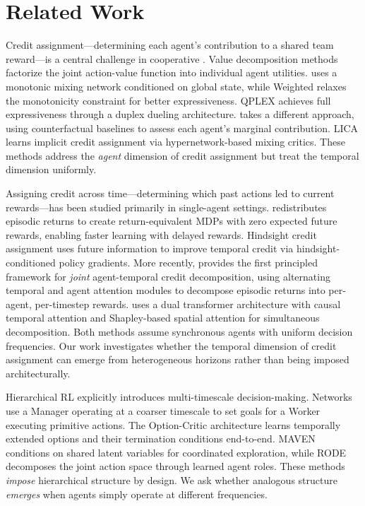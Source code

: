 \section{Related Work}
\label{sec:related}

Credit assignment---determining each agent's contribution to a shared team reward---is a central challenge in cooperative \marl. Value decomposition methods factorize the joint action-value function into individual agent utilities. \qmix \citep{rashid2018qmix} uses a monotonic mixing network conditioned on global state, while Weighted \qmix \citep{rashid2020weighted} relaxes the monotonicity constraint for better expressiveness. QPLEX \citep{wang2021qplex} achieves full expressiveness through a duplex dueling architecture. \coma \citep{foerster2018coma} takes a different approach, using counterfactual baselines to assess each agent's marginal contribution. LICA \citep{zhou2020lica} learns implicit credit assignment via hypernetwork-based mixing critics. These methods address the \emph{agent} dimension of credit assignment but treat the temporal dimension uniformly.

Assigning credit across time---determining which past actions led to current rewards---has been studied primarily in single-agent settings. \rudder \citep{arjona2019rudder} redistributes episodic returns to create return-equivalent MDPs with zero expected future rewards, enabling faster learning with delayed rewards. Hindsight credit assignment \citep{harutyunyan2019hindsight} uses future information to improve temporal credit via hindsight-conditioned policy gradients. More recently, \tartwo \citep{kapoor2024tar2} provides the first principled framework for \emph{joint} agent-temporal credit decomposition, using alternating temporal and agent attention modules to decompose episodic returns into per-agent, per-timestep rewards. \stas \citep{chen2024stas} uses a dual transformer architecture with causal temporal attention and Shapley-based spatial attention for simultaneous decomposition. Both methods assume synchronous agents with uniform decision frequencies. Our work investigates whether the temporal dimension of credit assignment can emerge from heterogeneous horizons rather than being imposed architecturally.

Hierarchical RL explicitly introduces multi-timescale decision-making. \feudal Networks \citep{vezhnevets2017feudal} use a Manager operating at a coarser timescale to set goals for a Worker executing primitive actions. The Option-Critic architecture \citep{bacon2017option} learns temporally extended options and their termination conditions end-to-end. MAVEN \citep{mahajan2019maven} conditions on shared latent variables for coordinated exploration, while RODE \citep{wang2021rode} decomposes the joint action space through learned agent roles. These methods \emph{impose} hierarchical structure by design. We ask whether analogous structure \emph{emerges} when agents simply operate at different frequencies.

